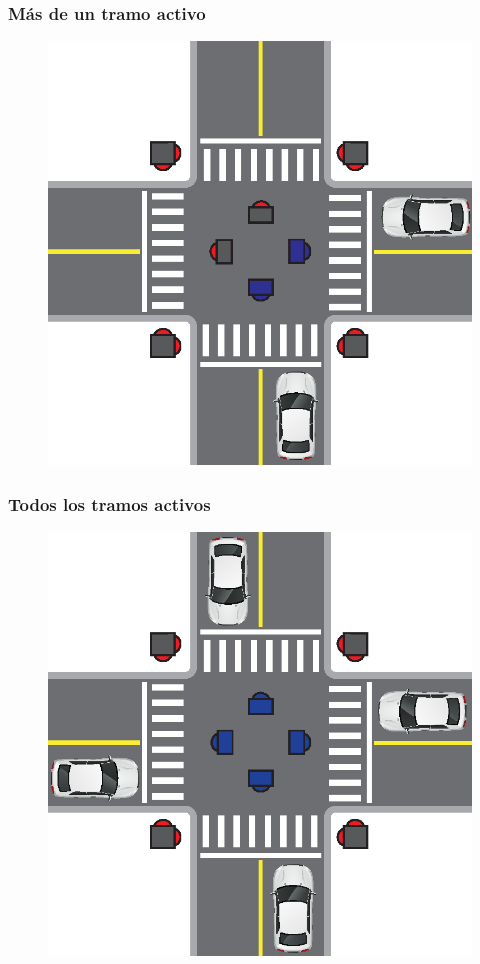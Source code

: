 \begin{frame}
\frametitle{Más de un tramo activo}
\begin{figure}[htbp]
	\centering
	\includegraphics[scale=\tamInterseccion]{diagramas/dos-activos.eps}
\end{figure}
\end{frame}

\begin{frame}
\frametitle{Todos los tramos activos}
\begin{figure}[htbp]
	\centering
	\includegraphics[scale=\tamInterseccion]{diagramas/todos-activos.eps}
\end{figure}
\end{frame}

